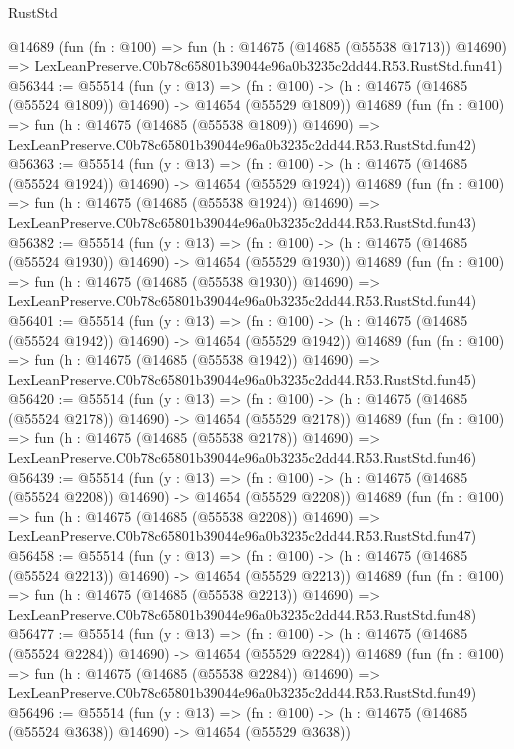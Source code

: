 \begin{lexlean}{RustStd}
\begin{coremodule}
    @14689
    (fun (fn : @100) =>
    fun (h : @14675 (@14685 (@55538 @1713)) @14690) =>
    LexLeanPreserve.C0b78c65801b39044e96a0b3235c2dd44.R53.RustStd.fun41)
@56344 := @55514
    (fun (y : @13) =>
    (fn : @100) -> (h : @14675 (@14685 (@55524 @1809)) @14690) -> @14654 (@55529 @1809))
    @14689
    (fun (fn : @100) =>
    fun (h : @14675 (@14685 (@55538 @1809)) @14690) =>
    LexLeanPreserve.C0b78c65801b39044e96a0b3235c2dd44.R53.RustStd.fun42)
@56363 := @55514
    (fun (y : @13) =>
    (fn : @100) -> (h : @14675 (@14685 (@55524 @1924)) @14690) -> @14654 (@55529 @1924))
    @14689
    (fun (fn : @100) =>
    fun (h : @14675 (@14685 (@55538 @1924)) @14690) =>
    LexLeanPreserve.C0b78c65801b39044e96a0b3235c2dd44.R53.RustStd.fun43)
@56382 := @55514
    (fun (y : @13) =>
    (fn : @100) -> (h : @14675 (@14685 (@55524 @1930)) @14690) -> @14654 (@55529 @1930))
    @14689
    (fun (fn : @100) =>
    fun (h : @14675 (@14685 (@55538 @1930)) @14690) =>
    LexLeanPreserve.C0b78c65801b39044e96a0b3235c2dd44.R53.RustStd.fun44)
@56401 := @55514
    (fun (y : @13) =>
    (fn : @100) -> (h : @14675 (@14685 (@55524 @1942)) @14690) -> @14654 (@55529 @1942))
    @14689
    (fun (fn : @100) =>
    fun (h : @14675 (@14685 (@55538 @1942)) @14690) =>
    LexLeanPreserve.C0b78c65801b39044e96a0b3235c2dd44.R53.RustStd.fun45)
@56420 := @55514
    (fun (y : @13) =>
    (fn : @100) -> (h : @14675 (@14685 (@55524 @2178)) @14690) -> @14654 (@55529 @2178))
    @14689
    (fun (fn : @100) =>
    fun (h : @14675 (@14685 (@55538 @2178)) @14690) =>
    LexLeanPreserve.C0b78c65801b39044e96a0b3235c2dd44.R53.RustStd.fun46)
@56439 := @55514
    (fun (y : @13) =>
    (fn : @100) -> (h : @14675 (@14685 (@55524 @2208)) @14690) -> @14654 (@55529 @2208))
    @14689
    (fun (fn : @100) =>
    fun (h : @14675 (@14685 (@55538 @2208)) @14690) =>
    LexLeanPreserve.C0b78c65801b39044e96a0b3235c2dd44.R53.RustStd.fun47)
@56458 := @55514
    (fun (y : @13) =>
    (fn : @100) -> (h : @14675 (@14685 (@55524 @2213)) @14690) -> @14654 (@55529 @2213))
    @14689
    (fun (fn : @100) =>
    fun (h : @14675 (@14685 (@55538 @2213)) @14690) =>
    LexLeanPreserve.C0b78c65801b39044e96a0b3235c2dd44.R53.RustStd.fun48)
@56477 := @55514
    (fun (y : @13) =>
    (fn : @100) -> (h : @14675 (@14685 (@55524 @2284)) @14690) -> @14654 (@55529 @2284))
    @14689
    (fun (fn : @100) =>
    fun (h : @14675 (@14685 (@55538 @2284)) @14690) =>
    LexLeanPreserve.C0b78c65801b39044e96a0b3235c2dd44.R53.RustStd.fun49)
@56496 := @55514
    (fun (y : @13) =>
    (fn : @100) -> (h : @14675 (@14685 (@55524 @3638)) @14690) -> @14654 (@55529 @3638))

\end{coremodule}
\end{lexlean}
